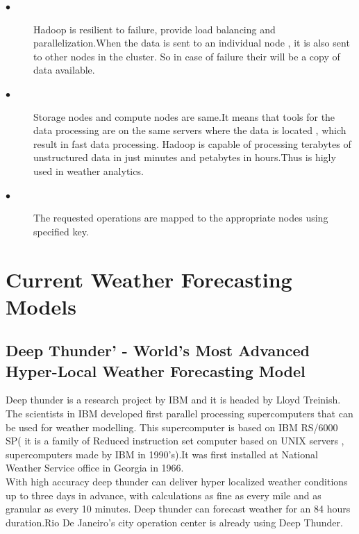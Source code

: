 \documentclass[sigconf]{acmart}
\begin{document}
\begin{description}

\item [$\bullet$]Hadoop is resilient to failure, provide load balancing and parallelization.When the data is sent to an individual node , it is also sent to other nodes in the cluster. So in case of failure their will be a copy of data available.

\item [$\bullet$] Storage nodes and compute nodes are same.It means that tools for the data processing are on the same servers where the data is located , which result in fast data processing. Hadoop is capable of processing terabytes of unstructured data in just minutes and petabytes in hours.Thus is higly used in weather analytics.

\item [$\bullet$] The requested operations are mapped to the appropriate nodes using specified key.\cite{Hadoop01}

\end{description}

\section{Current Weather Forecasting Models}



\subsection{Deep Thunder' - World's Most Advanced Hyper-Local Weather Forecasting Model}


Deep thunder is a research project by IBM and it is headed by Lloyd Treinish. The scientists in IBM developed first parallel processing supercomputers that can be used for weather modelling. This supercomputer is based on IBM RS/6000 SP( it is a family of Reduced instruction set computer based on UNIX servers , supercomputers made by IBM in 1990's).It was first installed at National Weather Service office in Georgia in 1966.\\
With high accuracy deep thunder can deliver hyper localized weather conditions up to three days in advance, with calculations as fine as every mile and as granular as every 10 minutes. Deep thunder can forecast weather for an 84 hours duration.Rio De Janeiro's city operation center is already using Deep Thunder.\cite{Coclus01}
\end{document}
